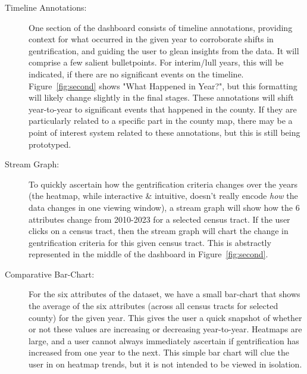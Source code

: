 \documentclass{article}
\begin{document}
\begin{description}
\begin{description}
        \begin{description}
        
            \item[Timeline Annotations:] One section of the dashboard consists of timeline annotations, providing context for what occurred in the given year to corroborate shifts in gentrification, and guiding the user to glean insights from the data. It will comprise a few salient bulletpoints. For interim/lull years, this will be indicated, if there are no significant events on the timeline. Figure~\ref{fig:second} shows "What Happened in Year?", but this formatting will likely change slightly in the final stages. These annotations will shift year-to-year to significant events that happened in the county. If they are particularly related to a specific part in the county map, there may be a point of interest system related to these annotations, but this is still being prototyped.
            
            \item[Stream Graph:] To quickly ascertain how the gentrification criteria changes over the years (the heatmap, while interactive \& intuitive, doesn't really encode \textit{how} the data changes in one viewing window), a stream graph will show how the 6 attributes change from 2010-2023 for a selected census tract. If the user clicks on a census tract, then the stream graph will chart the change in gentrification criteria for this given census tract. This is abstractly represented in the middle of the dashboard in Figure~\ref{fig:second}.
            
            \item[Comparative Bar-Chart:] For the six attributes of the dataset, we have a small bar-chart that shows the average of the six attributes (across all census tracts for selected county) for the given year. This gives the user a quick snapshot of whether or not these values are increasing or decreasing year-to-year. Heatmaps are large, and a user cannot always immediately ascertain if gentrification has increased from one year to the next. This simple bar chart will clue the user in on heatmap trends, but it is not intended to be viewed in isolation. 
            
        \end{description}
        
    \end{description}
    
\end{description}
\end{document}
